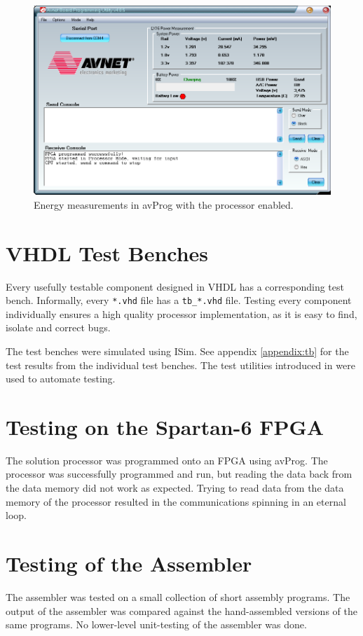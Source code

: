 \begin{figure}[H]
\includegraphics[width=\textwidth]{illustrations/running.PNG}
\caption{Energy measurements in avProg with the processor enabled.}
\label{figure:avprog-energy-running}
\end{figure}

\section{VHDL Test Benches}

Every usefully testable component designed in VHDL has a corresponding test bench.
Informally, every \texttt{*.vhd} file has a \texttt{tb\_*.vhd} file.
Testing every component individually ensures a high quality processor implementation, as it is easy to find, isolate and correct bugs.

The test benches were simulated using ISim. See appendix \vref{appendix:tb} for the test results from the individual test benches. 
The test utilities introduced in \cite{assignment-1} were used to automate testing.

\section{Testing on the Spartan-6 FPGA}

The solution processor was programmed onto an FPGA using avProg.
The processor was successfully programmed and run, but reading the data back from the data memory did not work as expected.
Trying to read data from the data memory of the processor resulted in the communications spinning in an eternal loop.

\section{Testing of the Assembler}

The assembler was tested on a small collection of short assembly programs.
The output of the assembler was compared against the hand-assembled versions of the same programs.
No lower-level unit-testing of the assembler was done.
